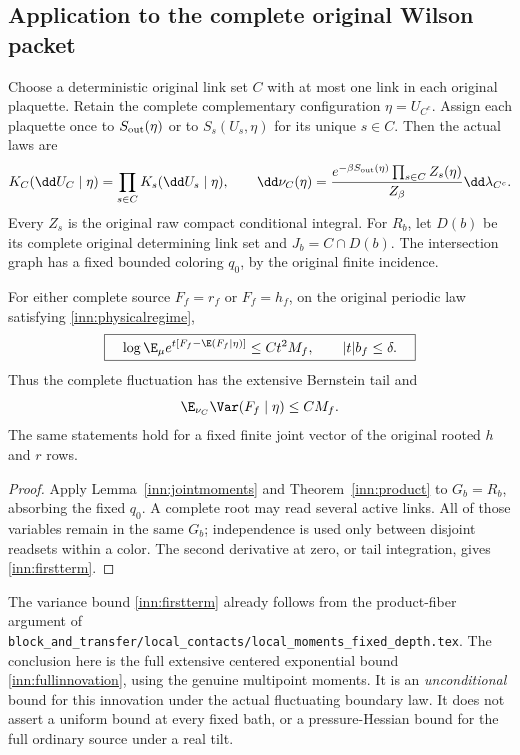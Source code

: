 \subsection{Application to the complete original Wilson packet}

Choose a deterministic original link set $C$ with at most one link in each original plaquette. Retain the complete complementary configuration $\eta=U_{C^c}$. Assign each plaquette once to $S_{\rm out}(\eta)$ or to $S_s(U_s,\eta)$ for its unique $s\in C$. Then the actual laws are
\begin{equation}
 K_C(\dd U_C\mid\eta)=\prod_{s\in C}K_s(\dd U_s\mid\eta),
 \qquad
 \dd\nu_C(\eta)=
 \frac{e^{-\beta S_{\rm out}(\eta)}\prod_{s\in C}Z_s(\eta)}
      {Z_\beta}\dd\lambda_{C^c}.
 \label{inn:rawmarginal}
\end{equation}
Every $Z_s$ is the original raw compact conditional integral. For $R_b$, let $D(b)$ be its complete original determining link set and $J_b=C\cap D(b)$. The intersection graph has a fixed bounded coloring $q_0$, by the original finite incidence.

\begin{corollary}
\label{inn:wilsoninnovation}
For either complete source $F_f=r_f$ or $F_f=h_f$, on the original periodic law satisfying \eqref{inn:physicalregime},
\begin{equation}
 \boxed{\quad
 \log\E_\mu
 e^{t[F_f-\E(F_f\mid\eta)]}\le Ct^2M_f,
 \qquad |t|b_f\le\delta.
 \quad}
 \label{inn:fullinnovation}
\end{equation}
Thus the complete fluctuation has the extensive Bernstein tail and
\begin{equation}
 \E_{\nu_C}\Var(F_f\mid\eta)\le CM_f.
 \label{inn:firstterm}
\end{equation}
The same statements hold for a fixed finite joint vector of the original rooted $h$ and $r$ rows.
\end{corollary}
\begin{proof}
Apply Lemma~\ref{inn:jointmoments} and Theorem~\ref{inn:product} to $G_b=R_b$, absorbing the fixed $q_0$. A complete root may read several active links. All of those variables remain in the same $G_b$; independence is used only between disjoint readsets within a color. The second derivative at zero, or tail integration, gives \eqref{inn:firstterm}.
\end{proof}

The variance bound \eqref{inn:firstterm} already follows from the product-fiber argument of \texttt{block\_and\_transfer/local\_contacts/local\_moments\_fixed\_depth.tex}. The conclusion here is the full extensive centered exponential bound \eqref{inn:fullinnovation}, using the genuine multipoint moments. It is an \emph{unconditional} bound for this innovation under the actual fluctuating boundary law. It does not assert a uniform bound at every fixed bath, or a pressure-Hessian bound for the full ordinary source under a real tilt.

